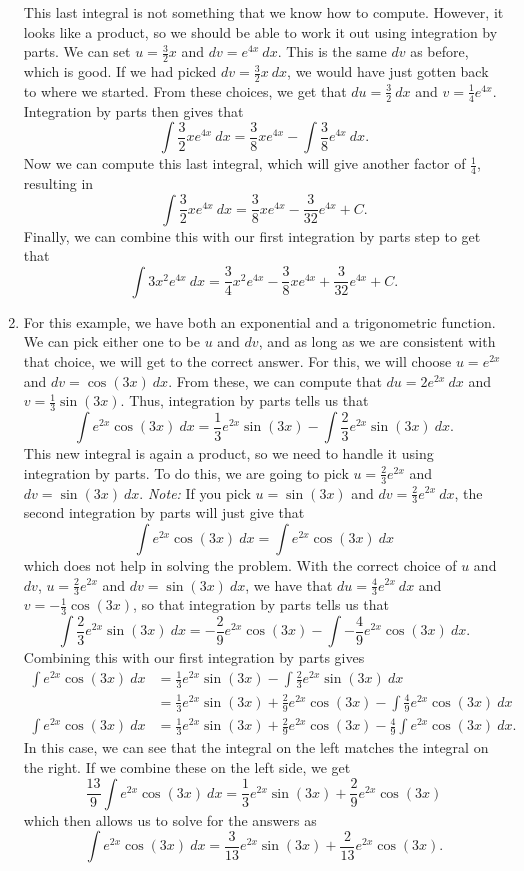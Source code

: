 \begin{exampleSol}
\begin{enumerate}
This last integral is not something that we know how to compute. However, it looks like a product, so we should be able to work it out using integration by parts. We can set $u = \frac{3}{2}x$ and $dv = e^{4x}\ dx$. This is the same $dv$ as before, which is good. If we had picked $dv = \frac{3}{2}x\ dx$, we would have just gotten back to where we started. From these choices, we get that $du = \frac{3}{2}\ dx$ and $v = \frac{1}{4} e^{4x}$. Integration by parts then gives that
\[ \int \frac{3}{2} xe^{4x}\ dx = \frac{3}{8}xe^{4x} - \int \frac{3}{8}e^{4x}\ dx. \] Now we can compute this last integral, which will give another factor of $\frac{1}{4}$, resulting in 
\[ \int \frac{3}{2} xe^{4x}\ dx = \frac{3}{8}xe^{4x} - \frac{3}{32}e^{4x} + C. \] Finally, we can combine this with our first integration by parts step to get that
\[ \int 3x^2e^{4x}\ dx =  \frac{3}{4}x^2e^{4x}- \frac{3}{8}xe^{4x} + \frac{3}{32}e^{4x} + C. \]
\item For this example, we have both an exponential and a trigonometric function. We can pick either one to be $u$ and $dv$, and as long as we are consistent with that choice, we will get to the correct answer. For this, we will choose $u = e^{2x}$ and $dv = \cos(3x)\ dx$. From these, we can compute that $du = 2e^{2x}\ dx$ and $v = \frac{1}{3}\sin(3x)$. Thus, integration by parts tells us that
\[ \int e^{2x}\cos(3x)\ dx = \frac{1}{3}e^{2x}\sin(3x) - \int \frac{2}{3}e^{2x}\sin(3x)\ dx.\] This new integral is again a product, so we need to handle it using integration by parts. To do this, we are going to pick $u = \frac{2}{3}e^{2x}$ and $dv = \sin(3x)\ dx$. \emph{Note:} If you pick $u = \sin(3x)$ and $dv = \frac{2}{3}e^{2x}\ dx$, the second integration by parts will just give that 
\[ \int e^{2x}\cos(3x) \ dx = \int e^{2x}\cos(3x)\ dx \] which does not help in solving the problem. With the correct choice of $u$ and $dv$, $u = \frac{2}{3}e^{2x}$ and $dv = \sin(3x)\ dx$, we have that $du = \frac{4}{3}e^{2x}\ dx$ and $v = -\frac{1}{3}\cos(3x)$, so that integration by parts tells us that
\[ \int \frac{2}{3}e^{2x}\sin(3x)\ dx = -\frac{2}{9}e^{2x}\cos(3x) - \int - \frac{4}{9}e^{2x}\cos(3x)\ dx.\] Combining this with our first integration by parts gives
\[ \begin{split}
\int e^{2x}\cos(3x)\ dx &= \frac{1}{3}e^{2x}\sin(3x) - \int \frac{2}{3}e^{2x}\sin(3x)\ dx \\
&= \frac{1}{3}e^{2x}\sin(3x)  + \frac{2}{9}e^{2x}\cos(3x) - \int \frac{4}{9}e^{2x}\cos(3x)\ dx \\
\int e^{2x}\cos(3x)\ dx &= \frac{1}{3}e^{2x}\sin(3x)  + \frac{2}{9}e^{2x}\cos(3x)- \frac{4}{9}\int e^{2x}\cos(3x)\ dx.
\end{split} \]
In this case, we can see that the integral on the left matches the integral on the right. If we combine these on the left side, we get
\[ \frac{13}{9} \int e^{2x}\cos(3x)\ dx = \frac{1}{3}e^{2x}\sin(3x)  + \frac{2}{9}e^{2x}\cos(3x) \] which then allows us to solve for the answers as
\[ \int e^{2x}\cos(3x)\ dx = \frac{3}{13}e^{2x}\sin(3x)  + \frac{2}{13}e^{2x}\cos(3x). \]
\end{enumerate}
\end{exampleSol}

